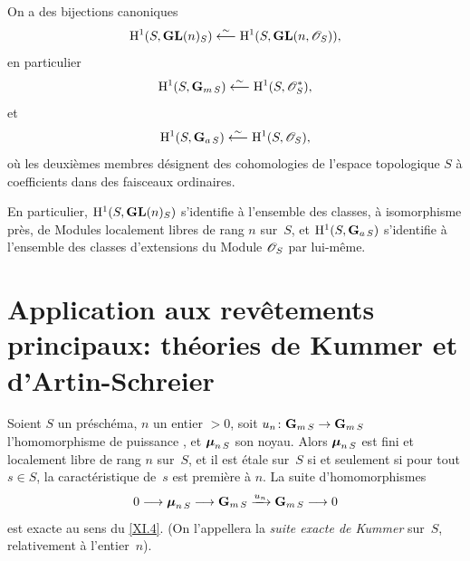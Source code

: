 \begin{corollaire}
\label{XI.5.3}
On a des bijections canoniques
$$
\H^1(S,\GL(n)_S)\isomfrom \H^1(S,\GL(n,\cal{O}_S))\quoi,
$$
en particulier
$$
\H^1(S,\GG_{m\,S})\isomfrom \H^1(S,\cal{O}_S^*)\quoi,
$$
et
$$
\H^1(S,\GG_{a\,S})\isomfrom \H^1(S,\cal{O}_S)\quoi,
$$
o\`u les deuxi\`emes membres d\'esignent des cohomologies de
l'espace topologique $S$ \`a coefficients dans des faisceaux
ordinaires.
\end{corollaire}

En particulier, $\mathrm{H}^1(S,\operatorname{\mathbf{GL}}(n)_S)$ s'identifie \`a l'ensemble des
classes, \`a isomorphisme pr\`es, de Modules localement libres de
rang $n$ sur~$S$, et $\mathrm{H}^1(S,\mathbf{G}_{a\,S})$ s'identifie \`a l'ensemble
des classes d'extensions du Module $\cal{O}_S$ par lui-m\^eme.

\section[Application aux rev\^etements principaux]{Application aux rev\^etements principaux: th\'eories de
Kummer et d'Artin-Schreier}
\label{XI.6}


\begin{proposition}
\label{XI.6.1}
Soient $S$ un pr\'esch\'ema, $n$ un entier $>0$, soit $u_n\colon
\GG_{m\,S}\to\GG_{m\,S}$ l'homomorphisme de puissance \nieme, et
$\boldsymbol{\mu}_{n\,S}$
\label{indnot:kb}son noyau. Alors $\boldsymbol{\mu}_{n\,S}$ est fini et localement libre de
rang $n$ sur~$S$, et il est \'etale sur~$S$ si et seulement si pour
tout $s\in S$, la caract\'eristique de~$s$ est premi\`ere \`a
$n$. La suite d'homomorphismes
$$
0\to \bbmu_{n\,S}\to\GG_{m\,S}\lto{u_n}\GG_{m\,S}\to 0
$$
est exacte au sens du \No \ref{XI.4}. (On l'appellera la \emph{suite exacte de
Kummer}
sur~$S$, relativement \`a l'entier~$n$).
\end{proposition}

